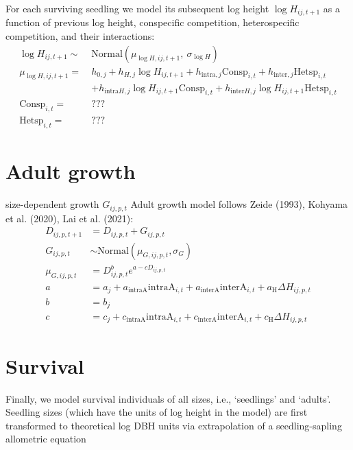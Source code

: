 \documentclass[12pt,a4paper]{article}
\begin{document}
For each surviving seedling we model its subsequent log height $\log H_{ij,t+1}$ as a function of previous log height, conspecific competition, heterospecific competition, and their interactions:
\begin{align}
\log H_{ij,t+1} \sim~& \text{Normal}(\mu_{\log H, ij,t+1},~\sigma_{\log H}) \\
\mu_{\log H, ij,t+1} =~& h_{0,j} + h_{H,j} \log H_{ij,t+1} + h_{\text{intra},j}\text{Consp}_{i,t} + h_{\text{inter},j}\text{Hetsp}_{i,t} \\
& + h_{\text{intra}H,j}\log H_{ij,t+1}\text{Consp}_{i,t} + h_{\text{inter}H,j}\log H_{ij,t+1}\text{Hetsp}_{i,t} \\
\text{Consp}_{i,t} =~& ??? \\
\text{Hetsp}_{i,t} =~& ???
\end{align}

\section{Adult growth}
size-dependent growth $G_{ij,p,t}$
Adult growth model follows Zeide (1993), Kohyama et al. (2020), Lai et al. (2021):
\begin{align}
D_{ij,p,t+1} &= D_{ij,p,t} + G_{ij,p,t}\\
G_{ij,p,t} &\sim \text{Normal}(\mu_{G,ij,p,t}, \sigma_{G}) \\
\mu_{G,ij,p,t} &= D_{ij,p,t}^{b} e^{a-c D_{ij,p,t}} \\
a &= a_j + a_\text{intraA} \text{intraA}_{i,t} + a_\text{interA} \text{interA}_{i,t} + a_\text{H} \Delta H_{ij,p,t} \\
b &= b_j \\
c &= c_j + c_\text{intraA} \text{intraA}_{i,t} + c_\text{interA} \text{interA}_{i,t} + c_\text{H} \Delta H_{ij,p,t}
\end{align}

\section{Survival}
Finally, we model survival individuals of all sizes, i.e., `seedlings' and `adults'. Seedling sizes (which have the units of log height in the model) are first transformed to theoretical log DBH units via extrapolation of a seedling-sapling allometric equation
\begin{align}
\end{align}
\end{document}
